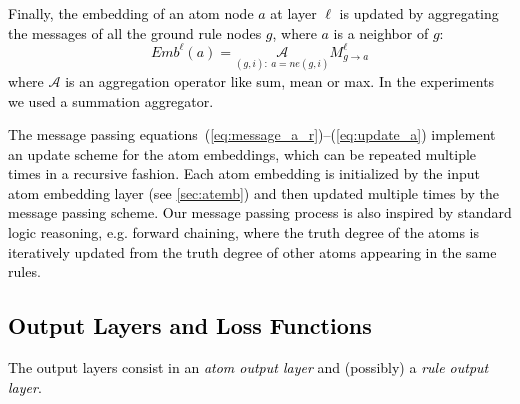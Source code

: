\documentclass[journal]{IEEEtran}
\newcommand{\ar}[1]{\textcolor{black}{#1}}
\begin{document}
\ar{Finally, the embedding of an atom node $a$ at layer $\ell$ is updated by aggregating the messages of all the ground rule nodes $g$, where $a$ is a neighbor of $g$:
\begin{equation}
   Emb^\ell(a) = \underset{(g,i):\ a = ne(g,i)}{\mathcal{A}} M^\ell_{g \rightarrow a}
   \label{eq:update_a}
\end{equation}
where $\mathcal{A}$ is an aggregation operator like sum, mean or max. In the experiments we used a summation aggregator.}

\ar{The message passing equations~(\ref{eq:message_a_r})--(\ref{eq:update_a}) implement an update scheme for the atom embeddings, which can be repeated multiple times in a recursive fashion. Each atom embedding is initialized by the input atom embedding layer (see \ref{sec:atemb}) and then updated multiple times by the message passing scheme.}
\ar{Our message passing process is also inspired by standard logic reasoning, e.g. forward chaining, where the truth degree of the atoms is iteratively updated from the truth degree of other atoms appearing in the same rules}. 
\ar{\subsection{Output Layers and Loss Functions}
\label{sec:outlay}}
\ar{The output layers consist in an \textit{atom output layer} and (possibly) a \textit{rule output layer}.}
\end{document}

